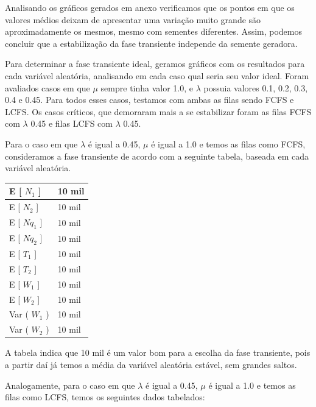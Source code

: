 \documentclass[a4paper,10pt]{article}
\begin{document}
    Analisando os gráficos gerados em anexo verificamos que os pontos em que os valores médios deixam de apresentar uma variação muito grande são aproximadamente os mesmos, mesmo com sementes diferentes. Assim, podemos concluir que a estabilização da fase transiente independe da semente geradora.

    Para determinar a fase transiente ideal, geramos gráficos com os resultados para cada variável aleatória, analisando em cada caso qual seria seu valor ideal. Foram avaliados casos em que $\mu$ sempre tinha valor 1.0, e $\lambda$ possuia valores 0.1, 0.2, 0.3, 0.4 e 0.45. Para todos esses casos, testamos com ambas as filas sendo FCFS e LCFS. Os casos críticos, que demoraram mais a se estabilizar foram as filas FCFS com $\lambda$ 0.45 e filas LCFS com $\lambda$ 0.45.

    Para o caso em que $\lambda$ é igual a 0.45, $\mu$ é igual a 1.0 e temos as filas como FCFS, consideramos a fase transiente de acordo com a seguinte tabela, baseada em cada variável aleatória.

\begin{center}
\begin{tabular} { | l | l | }
    \hline
    E [ $N_1$ ]  & 10 mil \\ \hline
    E [ $N_2$ ] & 10 mil \\ \hline
    E [ $Nq_1$ ] & 10 mil \\ \hline
    E [ $Nq_2$ ]	& 10 mil \\ \hline
    E [ $T_1$ ] & 10 mil \\ \hline
    E [ $T_2$ ] & 10 mil \\ \hline
    E [ $W_1$ ] & 10 mil \\ \hline
    E [ $W_2$ ] & 10 mil \\ \hline
    Var ( $W_1$ ) & 10 mil \\ \hline
    Var ( $W_2$ ) & 10 mil \\ \hline
\end{tabular}
\end{center}

    A tabela indica que 10 mil é um valor bom para a escolha da fase transiente, pois a partir daí já temos a média da variável aleatória estável, sem grandes saltos.

    Analogamente, para o caso em que $\lambda$ é igual a 0.45, $\mu$ é igual a 1.0 e temos as filas como LCFS, temos os seguintes dados tabelados:
\end{document}
